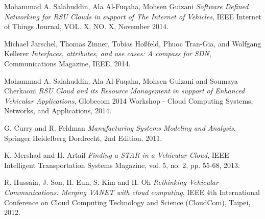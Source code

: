 \documentclass[conference]{IEEEtran}
\begin{document}
\begin{thebibliography}{1}

Mohammad A. Salahuddin, Ala Al-Fuqaha, Mohsen Guizani \emph{Software Defined Networking for RSU Clouds in support of The Internet of Vehicles}, IEEE Internet of Things Journal, VOL. X, NO. X, November 2014.


Michael Jarschel, Thomas Zinner, Tobias Hoßfeld, Phuoc Tran-Gia, and Wolfgang Kellerer \emph{Interfaces, attributes, and use cases: A compass for SDN}, Communications Magazine, IEEE, 2014.


Mohammad A. Salahuddin, Ala Al-Fuqaha, Mohsen Guizani and Soumaya Cherkaoui \emph{RSU Cloud and its Resource Management in
support of Enhanced Vehicular Applications}, Globecom 2014 Workshop - Cloud Computing Systems, Networks, and Applications, 2014.

G. Curry and R. Feldman \emph{Manufacturing Systems Modeling and Analysis}, Springer Heidelberg Dordrecht, 2nd Edition, 2011.

K. Mershad and H. Artail \emph{Finding a STAR in a Vehicular Cloud}, IEEE
Intelligent Transportation Systems Magazine, vol. 5, no. 2, pp. 55-68, 2013.

R. Hussain, J. Son, H. Eun, S. Kim and H. Oh \emph{Rethinking Vehicular
Communications: Merging VANET with cloud computing}, IEEE 4th
International Conference on Cloud Computing Technology and Science
(CloudCom), Taipei, 2012.


\end{thebibliography}
\end{document}
